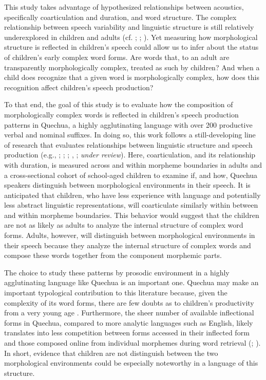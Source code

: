 \documentclass[a4paper,man,floatsintext,natbib,donotrepeattitle, apacite]{apa6}
\begin{document}
This study takes advantage of hypothesized relationships between acoustics, specifically coarticulation and duration, and word structure. The complex relationship between speech variability and linguistic structure is still relatively underexplored in children and adults (cf. \citealt{redfordGrammaticalWordProduction2018}; \citealt{songDurationalCuesFricative2013}; \citealt{songEffectsCoarticulationMorphological2013}). Yet measuring how morphological structure is reflected in children's speech could allow us to infer about the status of children's early complex word forms. Are words that, to an adult are transparently morphologically complex, treated as such by children? And when a child does recognize that a given word is morphologically complex, how does this recognition affect children's speech production? 

To that end, the goal of this study is to evaluate how the composition of morphologically complex words is reflected in children's speech production patterns in Quechua, a highly agglutinating language with over 200 productive verbal and nominal suffixes. In doing so, this work follows a still-developing line of research that evaluates relationships between linguistic structure and speech production (e.g., \citealt{hayCausesConsequencesWord2003}; \citealt{plagPhonologicalPhoneticVariability2014}; \citealt{songEffectsCoarticulationMorphological2013}; \citealt{songDurationalCuesFricative2013}, \citealt{strycharczukPhoneticDetailPhonetic2019}; \citeauthor{tomaschekHowAnticipatoryCoarticulation2019} \textit{under review}). Here, coarticulation, and its relationship with duration, is measured across and within morpheme boundaries in adults and a cross-sectional cohort of school-aged children to examine if, and how, Quechua speakers distinguish between morphological environments in their speech. It is anticipated that children, who have less experience with language and potentially less abstract linguistic representations, will coarticulate similarly within between and within morpheme boundaries. This behavior would suggest that the children are not as likely as adults to analyze the internal structure of complex word forms. Adults, however, will distinguish between morphological environments in their speech because they analyze the internal structure of complex words and compose these words together from the component morphemic parts.

The choice to study these patterns by prosodic environment in a highly agglutinating language like Quechua is an important one. Quechua may make an important typological contribution to this literature because, given the complexity of its word forms, there are few doubts as to children's productivity from a very young age \citep{courtneyLearningConstructVerbs2002}. Furthermore, the sheer number of available inflectional forms in Quechua, compared to more analytic languages such as English, likely translates into less competition between forms accessed in their inflected form and those composed online from individual morphemes during word retrieval (\citealt{hayCausesConsequencesWord2003}; \citealt{pinkerFutureTense2002}). In short, evidence that children are not distinguish between the two morphological environments could be especially noteworthy in a language of this structure.  
\end{document}
